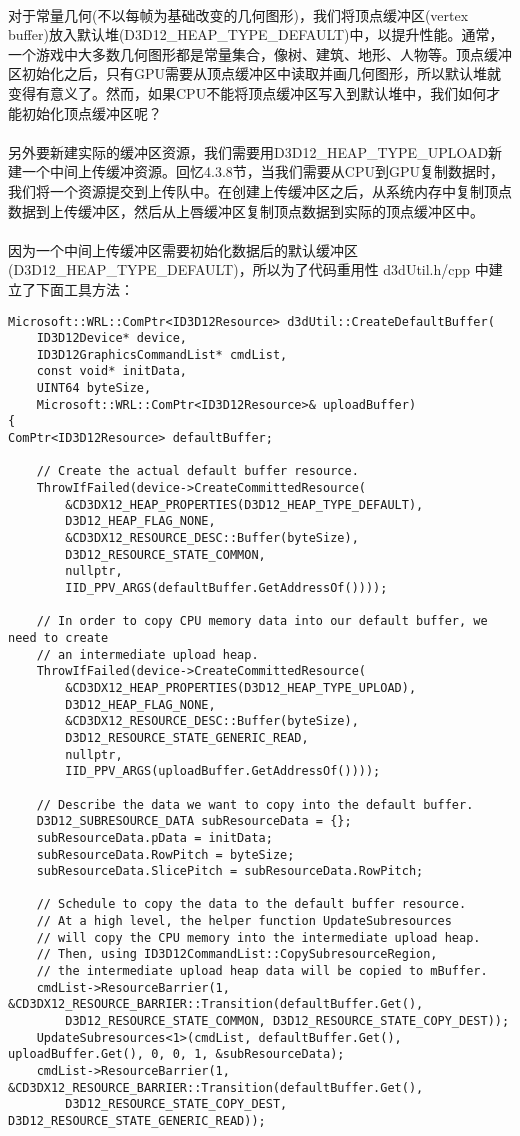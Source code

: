 \begin{flushleft}
~\\
对于常量几何(不以每帧为基础改变的几何图形)，我们将顶点缓冲区(vertex buffer)放入默认堆(D3D12\_HEAP\_TYPE\_DEFAULT)中，以提升性能。通常，一个游戏中大多数几何图形都是常量集合，像树、建筑、地形、人物等。顶点缓冲区初始化之后，只有GPU需要从顶点缓冲区中读取并画几何图形，所以默认堆就变得有意义了。然而，如果CPU不能将顶点缓冲区写入到默认堆中，我们如何才能初始化顶点缓冲区呢？\\
~\\
另外要新建实际的缓冲区资源，我们需要用D3D12\_HEAP\_TYPE\_UPLOAD新建一个中间上传缓冲资源。回忆4.3.8节，当我们需要从CPU到GPU复制数据时，我们将一个资源提交到上传队中。在创建上传缓冲区之后，从系统内存中复制顶点数据到上传缓冲区，然后从上唇缓冲区复制顶点数据到实际的顶点缓冲区中。\\
~\\
因为一个中间上传缓冲区需要初始化数据后的默认缓冲区(D3D12\_HEAP\_TYPE\_DEFAULT)，所以为了代码重用性 d3dUtil.h/cpp 中建立了下面工具方法：
\begin{lstlisting}
Microsoft::WRL::ComPtr<ID3D12Resource> d3dUtil::CreateDefaultBuffer(
    ID3D12Device* device,
    ID3D12GraphicsCommandList* cmdList,
    const void* initData,
    UINT64 byteSize,
    Microsoft::WRL::ComPtr<ID3D12Resource>& uploadBuffer)
{
ComPtr<ID3D12Resource> defaultBuffer;

    // Create the actual default buffer resource.
    ThrowIfFailed(device->CreateCommittedResource(
        &CD3DX12_HEAP_PROPERTIES(D3D12_HEAP_TYPE_DEFAULT),
        D3D12_HEAP_FLAG_NONE,
        &CD3DX12_RESOURCE_DESC::Buffer(byteSize),
        D3D12_RESOURCE_STATE_COMMON,
        nullptr,
        IID_PPV_ARGS(defaultBuffer.GetAddressOf())));

    // In order to copy CPU memory data into our default buffer, we need to create
    // an intermediate upload heap. 
    ThrowIfFailed(device->CreateCommittedResource(
        &CD3DX12_HEAP_PROPERTIES(D3D12_HEAP_TYPE_UPLOAD),
        D3D12_HEAP_FLAG_NONE,
        &CD3DX12_RESOURCE_DESC::Buffer(byteSize),
        D3D12_RESOURCE_STATE_GENERIC_READ,
        nullptr,
        IID_PPV_ARGS(uploadBuffer.GetAddressOf())));

    // Describe the data we want to copy into the default buffer.
    D3D12_SUBRESOURCE_DATA subResourceData = {};
    subResourceData.pData = initData;
    subResourceData.RowPitch = byteSize;
    subResourceData.SlicePitch = subResourceData.RowPitch;

    // Schedule to copy the data to the default buffer resource.  
    // At a high level, the helper function UpdateSubresources
    // will copy the CPU memory into the intermediate upload heap.  
    // Then, using ID3D12CommandList::CopySubresourceRegion,
    // the intermediate upload heap data will be copied to mBuffer.
    cmdList->ResourceBarrier(1, &CD3DX12_RESOURCE_BARRIER::Transition(defaultBuffer.Get(), 
        D3D12_RESOURCE_STATE_COMMON, D3D12_RESOURCE_STATE_COPY_DEST));
    UpdateSubresources<1>(cmdList, defaultBuffer.Get(), uploadBuffer.Get(), 0, 0, 1, &subResourceData);
    cmdList->ResourceBarrier(1, &CD3DX12_RESOURCE_BARRIER::Transition(defaultBuffer.Get(),
        D3D12_RESOURCE_STATE_COPY_DEST, D3D12_RESOURCE_STATE_GENERIC_READ));


\end{lstlisting}
\end{flushleft}
